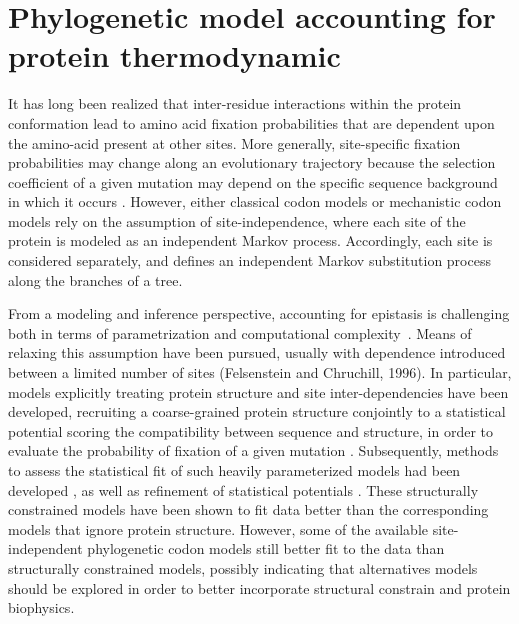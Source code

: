 \section{Phylogenetic model accounting for protein thermodynamic}

It has long been realized that inter-residue interactions within the protein conformation lead to amino acid fixation probabilities that are dependent upon the amino-acid present at other sites.
More generally, site-specific fixation probabilities may change along an evolutionary trajectory because the selection coefficient of a given mutation may depend on the specific sequence background in which it occurs \cite{Goldstein2016}.
However, either classical codon models or mechanistic codon models rely on the assumption of site-independence, where each site of the protein is modeled as an independent Markov process.
Accordingly, each site is considered separately, and defines an independent Markov substitution process along the branches of a tree.

From a modeling and inference perspective, accounting for epistasis is challenging both in terms of parametrization and computational complexity~\citep{Manhart2014}.
Means of relaxing this assumption have been pursued, usually with dependence introduced between a limited number of sites (Felsenstein and Chruchill, 1996).
In particular, models explicitly treating protein structure and site inter-dependencies have been developed, recruiting a coarse-grained protein structure conjointly to a statistical potential scoring the compatibility between sequence and structure, in order to evaluate the probability of fixation of a given mutation \citep{Rodrigue2005}.
Subsequently, methods to assess the statistical fit of such heavily parameterized models had been developed \citep{Rodrigue2009}, as well as refinement of statistical potentials \citep{Kleinman2010}.
These structurally constrained models have been shown to fit data better than the corresponding models that ignore protein structure.
However, some of the available site-independent phylogenetic codon models still better fit to the data than structurally constrained models, possibly indicating that alternatives models should be explored in order to better incorporate structural constrain and protein biophysics.

